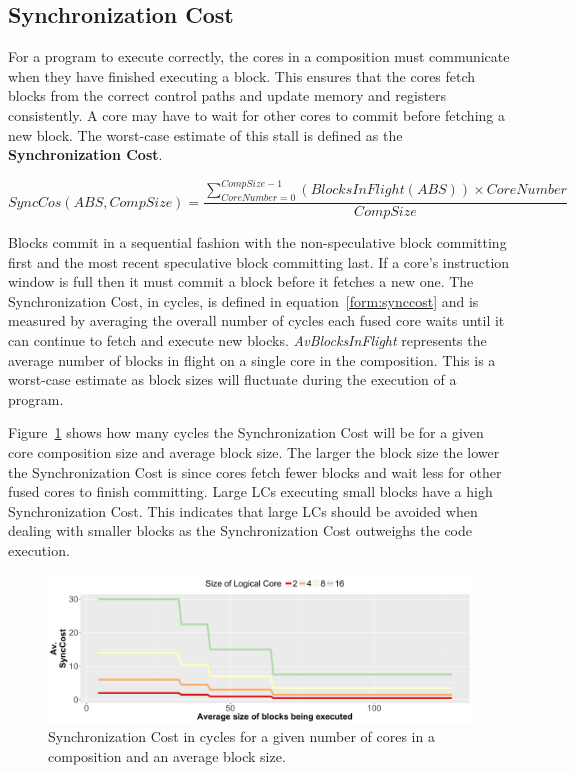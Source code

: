\subsection{Synchronization Cost}

For a program to execute correctly, the cores in a composition must communicate when they have finished executing a block.
This ensures that the cores fetch blocks from the correct control paths and update memory and registers consistently.
A core may have to wait for other cores to commit before fetching a new block. 
The worst-case estimate of this stall is defined as the \textbf{Synchronization Cost}.

\begin{equation}\label{form:synccost}
SyncCos(ABS,CompSize) = \frac{\sum_{CoreNumber=0}^{CompSize-1}\left(BlocksInFlight(ABS)\right) \times CoreNumber }{CompSize}
\end{equation}


Blocks commit in a sequential fashion with the non-speculative block committing first and the most recent speculative block committing last.
If a core's instruction window is full then it must commit a block before it fetches a new one.
The Synchronization Cost, in cycles, is defined in equation~\ref{form:synccost} and is measured by averaging the overall number of cycles each fused core waits until it can continue to fetch and execute new blocks.
\textit{AvBlocksInFlight} represents the average number of blocks in flight on a single core in the composition.
This is a worst-case estimate as block sizes will fluctuate during the execution of a program.

Figure~\ref{fig:sync_cost} shows how many cycles the Synchronization Cost will be for a given core composition size and average block size.
The larger the block size the lower the Synchronization Cost is since cores fetch fewer blocks and wait less for other fused cores to finish committing.
Large LCs executing small blocks have a high Synchronization Cost. 
This indicates that large LCs should be avoided when dealing with smaller blocks as the Synchronization Cost outweighs the code execution.

\begin{figure}[t]
    \centering
    \includegraphics[width=\textwidth]{cases-paper/graphics/limit_study/sync_cost.pdf}

    \caption{Synchronization Cost in cycles for a given number of cores in a composition and an average block size.} %
    \label{fig:sync_cost}
	\vspace{1em}
\end{figure}



